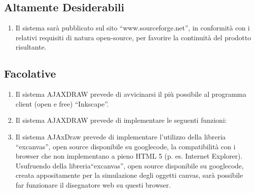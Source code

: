 \documentclass[a4paper]{article}
\begin{document}
\subsection{Altamente Desiderabili}
\begin{enumerate}
\item Il sistema sarà pubblicato sul sito “www.sourceforge.net”, in conformità con i relativi requisiti di natura open-source, per favorire la continuità del prodotto risultante.
\end{enumerate}

\subsection{Facolative}
\begin{enumerate}
\item Il sistema AJAXDRAW prevede di avvicinarsi il più possibile al programma client (open e free) “Inkscape”. 
\item Il sistema AJAXDRAW prevede di implementare le seguenti funzioni:


\item Il sistema  AJAxDraw prevede di implementare l'utilizzo della libreria “excanvas”, open source disponibile su googlecode, la compatibilità con i browser che non implementano a pieno HTML 5 (p. es. Internet Explorer).
         Usufruendo della libreria“excanvas”, open source disponibile su googlecode, creata appositamente per la simulazione degli oggetti canvas, sarà possibile far funzionare il disegnatore web su questi browser. 
\end{enumerate}
\end{document}
